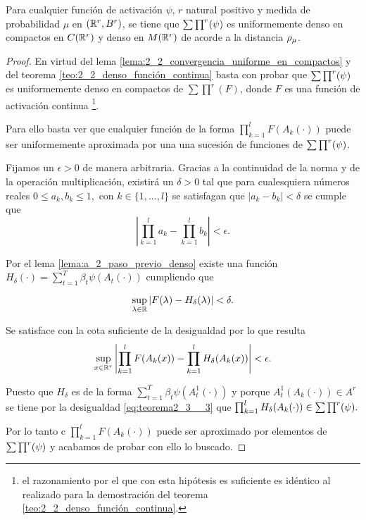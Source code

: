 \begin{teorema}
    Para cualquier función de activación $\psi$, $r$ natural positivo y
    medida de probabilidad $\mu$ en $(\mathbb{R}^r, B^r)$, 
    se tiene que $\sum \prod^r (\psi)$ es uniformemente denso en compactos
    en $C(\mathbb{R}^r)$ y denso en $M(\mathbb{R}^r)$ de acorde a la distancia $\rho_{\mu}$. 
\end{teorema}
\begin{proof}
    En virtud del lema \ref{lema:2_2_convergencia_uniforme_en_compactos} y del 
    teorema \ref{teo:2_2_denso_función_continua} basta con probar que 
    $\sum \prod^r (\psi)$ es uniformemente denso en compactos de $\sum \prod^r(F)$, 
    donde $F$ es una función de activación continua 
    \footnote{el razonamiento 
    por el que con esta hipótesis es suficiente es idéntico al realizado para la 
    demostración del teorema \ref{teo:2_2_denso_función_continua}.}.

    Para ello basta ver que cualquier función de la forma $\prod_{k=1}^l F(A_k(\cdot))$
    puede ser uniformemente aproximada por una una sucesión de funciones de $\sum \prod^r (\psi)$.

    Fijamos un $\epsilon > 0$  de manera arbitraria. 
    Gracias a la continuidad de la norma y de la operación multiplicación, existirá un $\delta >0$
    tal que para cualesquiera números reales $0 \leq a_k, b_k \leq 1,$ con $k \in \{1,...,l\}$ 
    se satisfagan que $|a_k -b_k| < \delta$ se cumple que 
    \begin{equation} \label{eq:teorema_2_3__1}
        \left| 
            \prod^l_{k=1} a_k - \prod^l_{k=1} b_k 
        \right| 
        < 
        \epsilon.
    \end{equation}

    Por el lema \ref{lema:a_2_paso_previo_denso} existe una función 
    $H_{\delta}(\cdot) = \sum_{t=1}^T \beta_t \psi(A_t(\cdot))$
    cumpliendo que 

    \begin{equation}
        \sup_{\lambda \in \mathbb{R}} |F(\lambda) - H_{\delta}(\lambda) | < \delta.
    \end{equation}

    Se satisface con la cota suficiente de la desigualdad  por lo que 
    resulta 
    \begin{equation}\label{eq:teorema2_3__3}
        \sup_{x \in \mathbb{R}^r} 
        \left| 
            \prod ^l_{k=1} F(A_k(x))
            -
            \prod ^l_{k=1} H_\delta(A_k(x))
        \right| 
        < 
        \epsilon.
    \end{equation} 
    
    Puesto que $H_\delta$ es de la forma  $\sum_{t=1}^T \beta_t \psi(A^1_t(\cdot))$ 
    y porque $A^1_t(A_k(\cdot)) \in A^r$ se tiene por la desigualdad \ref{eq:teorema2_3__3} que 
    $\prod ^l_{k=1} H_\delta(A_k(\cdot)) \in \sum \prod^r (\psi).$

    Por lo tanto c $\prod ^l_{k=1} F(A_k(\cdot))$ puede ser 
    aproximado por elementos de $\sum \prod^r (\psi)$ y acabamos de probar con ello lo buscado. 
\end{proof} 

